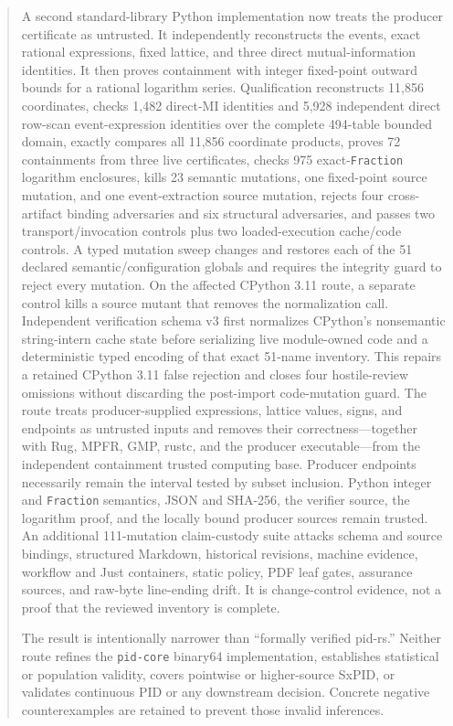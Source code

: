 \documentclass[11pt]{article}
\theoremstyle{definition}
\begin{document}
\begin{abstract}
A second standard-library Python implementation now treats the producer certificate as untrusted.
It independently reconstructs the events, exact rational expressions, fixed lattice, and three
direct mutual-information identities.  It then proves containment with integer fixed-point
outward bounds for a rational logarithm series.  Qualification reconstructs 11,856 coordinates,
checks 1,482 direct-MI identities and 5,928 independent direct row-scan event-expression
identities over the complete 494-table bounded domain, exactly compares all 11,856 coordinate
products, proves 72 containments from three live
certificates, checks 975 exact-\texttt{Fraction} logarithm enclosures, kills 23 semantic
mutations, one fixed-point source mutation, and one event-extraction source mutation, rejects
four cross-artifact binding adversaries and six structural adversaries, and passes two
transport/invocation controls plus two loaded-execution cache/code controls.  A typed mutation
sweep changes and restores each of the 51 declared semantic/configuration globals and requires
the integrity guard to reject every mutation.  On the affected CPython 3.11 route, a separate
control kills a source mutant that removes the normalization call.  Independent verification
schema v3 first normalizes CPython's nonsemantic string-intern cache state before serializing live
module-owned code and a deterministic typed encoding of that exact 51-name inventory.  This
repairs a retained CPython 3.11 false rejection and closes four hostile-review omissions without
discarding the post-import code-mutation guard.  The route treats
producer-supplied expressions, lattice
values, signs, and endpoints as untrusted inputs and removes their correctness---together with
Rug, MPFR, GMP, rustc, and the producer executable---from the independent containment trusted
computing base.  Producer endpoints necessarily remain the interval tested by subset inclusion.
Python integer and \texttt{Fraction} semantics, JSON and SHA-256, the verifier source, the
logarithm proof, and the locally bound producer sources remain trusted.
An additional 111-mutation claim-custody suite attacks schema and source bindings, structured
Markdown, historical revisions, machine evidence, workflow and Just containers, static policy,
PDF leaf gates, assurance sources, and raw-byte line-ending drift.  It is change-control evidence,
not a proof that the reviewed inventory is complete.

The result is intentionally narrower than ``formally verified pid-rs.''  Neither route refines the
\texttt{pid-core} binary64 implementation, establishes statistical or population validity, covers
pointwise or higher-source SxPID, or validates continuous PID or any downstream decision.
Concrete negative counterexamples are retained to prevent those invalid inferences.
\end{abstract}
\end{document}
